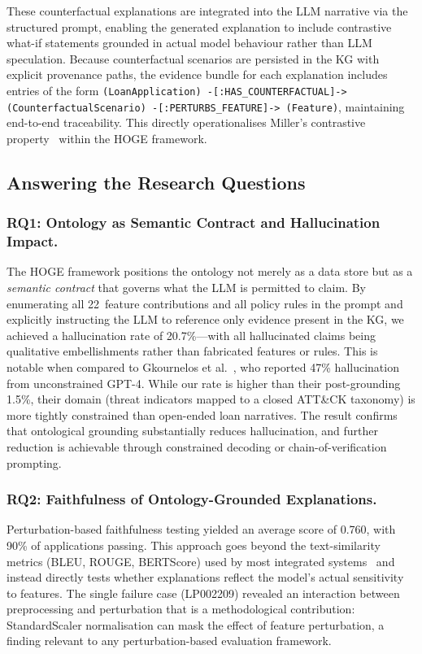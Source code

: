 \documentclass[lnbip]{svmultln}
\begin{document}
These counterfactual explanations are integrated into the LLM narrative via the structured prompt, enabling the generated explanation to include contrastive what-if statements grounded in actual model behaviour rather than LLM speculation. Because counterfactual scenarios are persisted in the KG with explicit provenance paths, the evidence bundle for each explanation includes entries of the form \texttt{(LoanApplication) -[:HAS\_COUNTERFACTUAL]-> (CounterfactualScenario) -[:PERTURBS\_FEATURE]-> (Feature)}, maintaining end-to-end traceability. This directly operationalises Miller's contrastive property~\cite{miller2019} within the HOGE framework.

\subsection{Answering the Research Questions}

\subsubsection{RQ1: Ontology as Semantic Contract and Hallucination Impact.}
The HOGE framework positions the ontology not merely as a data store but as a \emph{semantic contract} that governs what the LLM is permitted to claim. By enumerating all 22~feature contributions and all policy rules in the prompt and explicitly instructing the LLM to reference only evidence present in the KG, we achieved a hallucination rate of 20.7\%---with all hallucinated claims being qualitative embellishments rather than fabricated features or rules. This is notable when compared to Gkournelos et al.~\cite{threat2025}, who reported 47\% hallucination from unconstrained GPT-4. While our rate is higher than their post-grounding 1.5\%, their domain (threat indicators mapped to a closed ATT\&CK taxonomy) is more tightly constrained than open-ended loan narratives. The result confirms that ontological grounding substantially reduces hallucination, and further reduction is achievable through constrained decoding or chain-of-verification prompting.

\subsubsection{RQ2: Faithfulness of Ontology-Grounded Explanations.}
Perturbation-based faithfulness testing yielded an average score of 0.760, with 90\% of applications passing. This approach goes beyond the text-similarity metrics (BLEU, ROUGE, BERTScore) used by most integrated systems~\cite{gdm2026,medsum2026,medkgcot2025} and instead directly tests whether explanations reflect the model's actual sensitivity to features. The single failure case (LP002209) revealed an interaction between preprocessing and perturbation that is a methodological contribution: StandardScaler normalisation can mask the effect of feature perturbation, a finding relevant to any perturbation-based evaluation framework.
\end{document}
